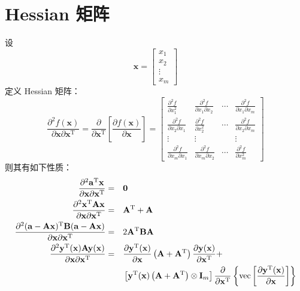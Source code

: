 \documentclass[UTF8,space=auto]{ctexart} %
\begin{document}
\section{Hessian 矩阵}
设
\[
\mathbf{x} =
\begin{bmatrix}
	x_1 \\ x_2 \\ \vdots \\ x_m
\end{bmatrix}
\]
定义 Hessian 矩阵：
\[
\frac{\partial^{2} f(\mathbf{x})}{\partial \mathbf{x} \partial \mathbf{x}^{\mathrm{T}}}=\frac{\partial}{\partial \mathbf{x}^{\mathrm{T}}}\left[\frac{\partial f(\mathbf{x})}{\partial \mathbf{x}}\right] =
\begin{bmatrix}
	\frac{\partial^{2} f}{\partial x_{1}^{2}} & \frac{\partial^{2} f}{\partial x_{1} \partial x_{2}} & \cdots & \frac{\partial^{2} f}{\partial x_{1} \partial x_{m}} \\
	\frac{\partial^{2} f}{\partial x_{2} \partial x_{1}} & \frac{\partial^{2} f}{\partial x_{2}^{2}} & \cdots & \frac{\partial^{2} f}{\partial x_{2} \partial x_{m}} \\
	\vdots & \vdots & & \vdots \\
	\frac{\partial^{2} f}{\partial x_{m} \partial x_{1}} & \frac{\partial^{2} f}{\partial x_{m} \partial x_{2}} & \cdots & \frac{\partial^{2} f}{\partial x_{m}^{2}}
\end{bmatrix}
\]
则其有如下性质：
\begin{alignat}{2}
\frac{\partial^{2} \mathbf{a}^{\mathrm{T}} \mathbf{x}}{\partial \mathbf{x} \partial \mathbf{x}^{\mathrm{T}}}&=&&\mathbf{0} \\
\frac{\partial^{2} \mathbf{x}^{\mathrm{T}} \mathbf{A} \mathbf{x}}{\partial \mathbf{x} \partial \mathbf{x}^{\mathrm{T}}} &=&&\mathbf{A}^{\mathrm{T}}+\mathbf{A} \\
\frac{\partial^{2}(\mathbf{a}-\mathbf{A} \mathbf{x})^{\mathrm{T}} \mathbf{B}(\mathbf{a}-\mathbf{A} \mathbf{x})}{\partial \mathbf{x} \partial \mathbf{x}^{\mathrm{T}}}&=&&2 \mathbf{A}^{\mathrm{T}} \mathbf{B} \mathbf{A} \\
\frac{\partial^{2}\mathbf{y}^{\mathrm{T}}(\mathbf{x}) \mathbf{A} \mathbf{y}(\mathbf{x})}{\partial \mathbf{x} \partial \mathbf{x}^{\mathrm{T}}} &=&&\frac{\partial\mathbf{y}^{\mathrm{T}}(\mathbf{x})}{\partial \mathbf{x}}\left(\mathbf{A}+\mathbf{A}^{\mathrm{T}}\right) \frac{\partial \mathbf{y}(\mathbf{x})}{\partial \mathbf{x}^{\mathrm{T}}} + \notag \\
&&&\left[\mathbf{y}^{\mathrm{T}}(\mathbf{x})\left(\mathbf{A}+\mathbf{A}^{\mathrm{T}}\right) \otimes \mathbf{I}_{m}\right] \frac{\partial}{\partial \mathbf{x}^{\mathrm{T}}}\left\{\operatorname{vec}\left[\frac{\partial\mathbf{y}^{\mathrm{T}}(\mathbf{x})}{\partial \mathbf{x}}\right]\right\}
\end{alignat}
\end{document}
